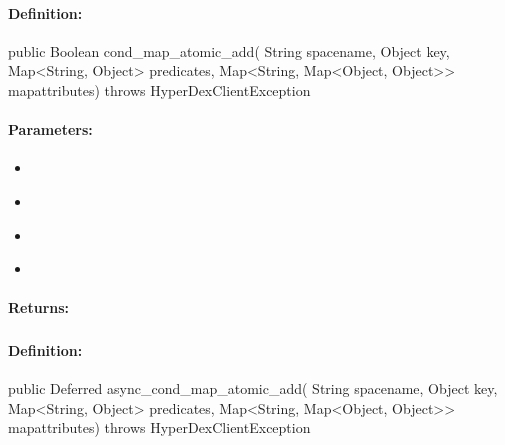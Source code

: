 \paragraph{Definition:}
\begin{javacode}
public Boolean cond_map_atomic_add(
        String spacename,
        Object key,
        Map<String, Object> predicates,
        Map<String, Map<Object, Object>> mapattributes) throws HyperDexClientException
\end{javacode}

\paragraph{Parameters:}
\begin{itemize}[noitemsep]
\item {}\\

\item {}\\

\item {}\\

\item {}\\

\end{itemize}

\paragraph{Returns:}


\pagebreak
\subsubsection{}
\label{api:java:async_cond_map_atomic_add}


\paragraph{Definition:}
\begin{javacode}
public Deferred async_cond_map_atomic_add(
        String spacename,
        Object key,
        Map<String, Object> predicates,
        Map<String, Map<Object, Object>> mapattributes) throws HyperDexClientException
\end{javacode}

